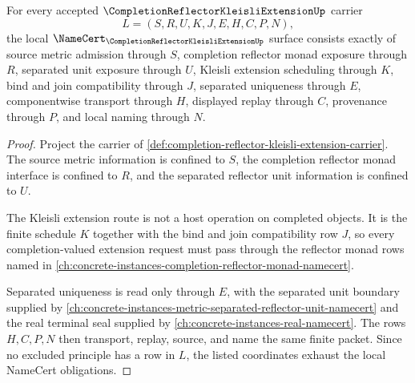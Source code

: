 \begin{theorem}
\label{thm:completion-reflector-kleisli-extension-namecert-obligations}
For every accepted $\CompletionReflectorKleisliExtensionUp$ carrier
$$
L=(S,R,U,K,J,E,H,C,P,N),
$$
the local $\NameCert_{\CompletionReflectorKleisliExtensionUp}$ surface consists exactly of source metric admission through $S$, completion reflector monad exposure through $R$, separated unit exposure through $U$, Kleisli extension scheduling through $K$, bind and join compatibility through $J$, separated uniqueness through $E$, componentwise transport through $H$, displayed replay through $C$, provenance through $P$, and local naming through $N$.
\end{theorem}
\begin{proof}
Project the carrier of \autoref{def:completion-reflector-kleisli-extension-carrier}. The source metric information is confined to $S$, the completion reflector monad interface is confined to $R$, and the separated reflector unit information is confined to $U$.

The Kleisli extension route is not a host operation on completed objects. It is the finite schedule $K$ together with the bind and join compatibility row $J$, so every completion-valued extension request must pass through the reflector monad rows named in \autoref{ch:concrete-instances-completion-reflector-monad-namecert}.

Separated uniqueness is read only through $E$, with the separated unit boundary supplied by \autoref{ch:concrete-instances-metric-separated-reflector-unit-namecert} and the real terminal seal supplied by \autoref{ch:concrete-instances-real-namecert}. The rows $H,C,P,N$ then transport, replay, source, and name the same finite packet. Since no excluded principle has a row in $L$, the listed coordinates exhaust the local NameCert obligations.
\end{proof}

